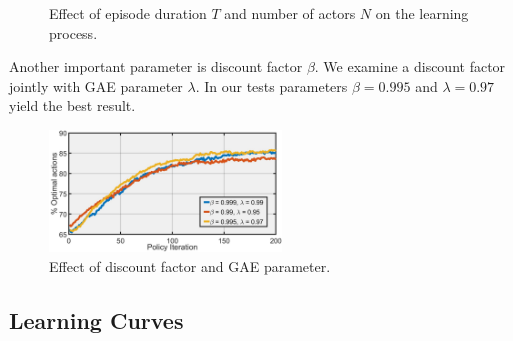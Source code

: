 \documentclass[11pt]{article}
\theoremstyle{definition}
\numberwithin{equation}{section}
\begin{document}
   \begin{figure}[!ht]
     \hfill
     \caption{Effect of episode duration $T$ and number of actors $N$ on the learning process. }
     \label{fig:TE}
   \end{figure}



Another important parameter is discount factor $\beta$. We examine a discount factor jointly with GAE parameter $\lambda.$ In our tests parameters $\beta = 0.995$ and $\lambda = 0.97$ yield the best result.


\begin{figure}[H]
\centering%
\includegraphics[width=0.55\textwidth, height=0.30\textwidth]{Paper_beta.JPG}
\caption[]{Effect of discount factor and GAE parameter.  }
\label{fig:beta}%
\end{figure}


\subsection{Learning Curves}
\end{document}
